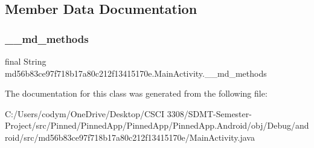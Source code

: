 \subsection{Member Data Documentation}
\mbox{\label{classmd56b83ce97f718b17a80c212f13415170e_1_1_main_activity_aa8091dd55d89e19cbee0112093629ec0}} 
\subsubsection{\texorpdfstring{\+\_\+\+\_\+md\+\_\+methods}{\_\_md\_methods}}
{\footnotesize\ttfamily final String md56b83ce97f718b17a80c212f13415170e.\+Main\+Activity.\+\_\+\+\_\+md\+\_\+methods\hspace{0.3cm}{\ttfamily [static]}}



The documentation for this class was generated from the following file\+:\begin{DoxyCompactItemize}
\item 
C\+:/\+Users/codym/\+One\+Drive/\+Desktop/\+C\+S\+C\+I 3308/\+S\+D\+M\+T-\/\+Semester-\/\+Project/src/\+Pinned/\+Pinned\+App/\+Pinned\+App/\+Pinned\+App.\+Android/obj/\+Debug/android/src/md56b83ce97f718b17a80c212f13415170e/Main\+Activity.\+java\end{DoxyCompactItemize}

